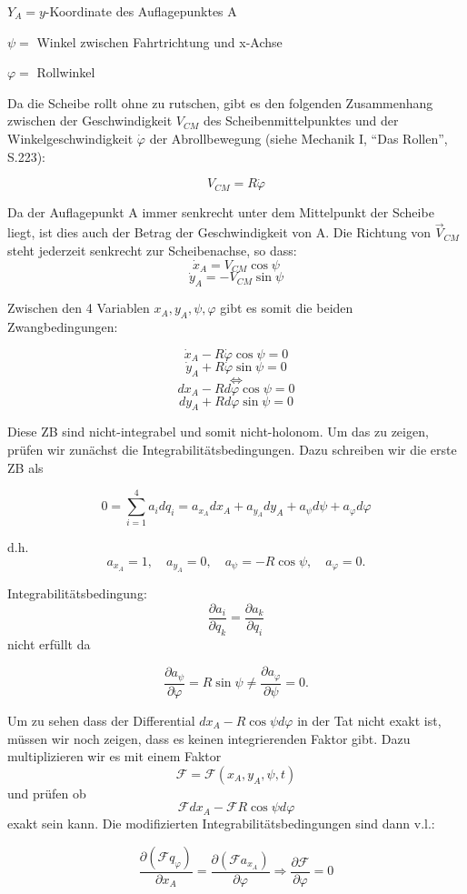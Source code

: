 \documentclass[10pt, letterpaper]{article}
\begin{document}
$Y_A = y$-Koordinate des Auflagepunktes A

$\psi = $ Winkel zwischen Fahrtrichtung und x-Achse

$\varphi = $ Rollwinkel

Da die Scheibe rollt ohne zu rutschen, gibt es den folgenden Zusammenhang zwischen der Geschwindigkeit $V_{CM}$ des Scheibenmittelpunktes und der Winkelgeschwindigkeit $\dot{\varphi}$ der Abrollbewegung (siehe Mechanik I, ``Das Rollen'', S.223):

\[V_{CM} = R \dot{\varphi}\]

Da der Auflagepunkt A immer senkrecht unter dem Mittelpunkt der Scheibe liegt, ist dies auch der Betrag der Geschwindigkeit von A. Die Richtung von $\vec{V}_{CM}$ steht jederzeit senkrecht zur Scheibenachse, so dass:
\[\dot{x}_A = V_{CM} \cos\psi\]
\[\dot{y}_A = -V_{CM} \sin\psi\]

Zwischen den 4 Variablen $x_A, y_A, \psi, \varphi$ gibt es somit die beiden Zwangbedingungen:

\[\dot{x}_A - R\dot{\varphi} \cos\psi = 0\]
\[\dot{y}_A + R\dot{\varphi} \sin\psi = 0\]
\[\Leftrightarrow\]
\[dx_A - R d\varphi \cos\psi = 0\]
\[dy_A + R d\varphi \sin\psi = 0\]

Diese ZB sind nicht-integrabel und somit nicht-holonom.
Um das zu zeigen, prüfen wir zunächst die Integrabilitätsbedingungen.
Dazu schreiben wir die erste ZB als

\[0 = \sum_{i=1}^4 a_i dq_i = a_{x_A} dx_A + a_{y_A} dy_A + a_\psi d\psi + a_\varphi d\varphi\]

d.h. \[a_{x_A} = 1, \quad a_{y_A} = 0, \quad a_\psi = -R\cos\psi, \quad a_\varphi = 0.\]

Integrabilitätsbedingung: \[\frac{\partial a_i}{\partial q_k} = \frac{\partial a_k}{\partial q_i}\] nicht erfüllt da

\[\frac{\partial a_\psi}{\partial \varphi} = R \sin\psi \neq \frac{\partial a_\varphi}{\partial \psi} = 0.\]

Um zu sehen dass der Differential $dx_A - R\cos\psi d\varphi$ in der Tat nicht exakt ist, müssen wir noch zeigen, dass es keinen integrierenden Faktor gibt. Dazu multiplizieren wir es mit einem Faktor \[\mathcal{F} = \mathcal{F}(x_A, y_A, \psi, t)\] und prüfen ob \[\mathcal{F} dx_A - \mathcal{F}R\cos\psi d\varphi\] exakt sein kann. Die modifizierten Integrabilitätsbedingungen sind dann v.l.:

\[\frac{\partial(\mathcal{F}q_\varphi)}{\partial x_A} = \frac{\partial(\mathcal{F}a_{x_A})}{\partial \varphi} \Rightarrow \frac{\partial \mathcal{F}}{\partial \varphi} = 0\]
\end{document}
